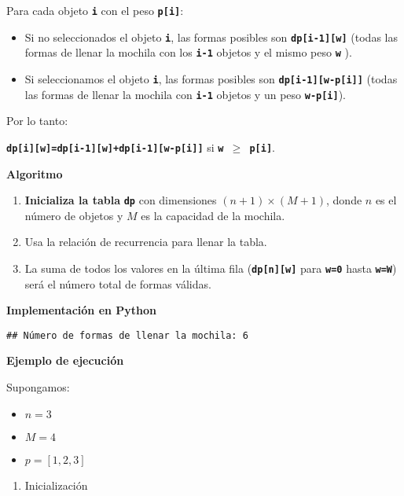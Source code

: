 \begin{enumerate}[label=\color{red}\textbf{\arabic*)}]
  Para cada objeto \textbf{\texttt{i}} con el peso \textbf{\texttt{p[i]}}:
  \begin{itemize}[label=\textbullet]
    \item Si no seleccionados el objeto \textbf{\texttt{i}}, las formas posibles son \textbf{\texttt{dp[i-1][w]}} (todas las formas de llenar la mochila con los \textbf{\texttt{i-1}} objetos y el mismo peso \textbf{\texttt{w}} ).
    \item Si seleccionamos el objeto \textbf{\texttt{i}}, las formas posibles son \textbf{\texttt{dp[i-1][w-p[i]]}} (todas las formas de llenar la mochila con \textbf{\texttt{i-1}} objetos y un peso \textbf{\texttt{w-p[i]}}).
  \end{itemize}
  Por lo tanto:
  \begin{center}
    \textbf{\texttt{dp[i][w]=dp[i-1][w]+dp[i-1][w-p[i]]}} si \textbf{\texttt{w $\ge$ p[i]}}. 
  \end{center}
  \textbf{Algoritmo}
  \begin{enumerate}[label=\arabic*)]
    \item \textbf{Inicializa la tabla} \textbf{\texttt{dp}} con dimensiones $(n+1)\times (M+1)$, donde $n$ es el número de objetos y $M$ es la capacidad de la mochila.
    \item Usa la relación de recurrencia para llenar la tabla.
    \item La suma de todos los valores en la última fila (\textbf{\texttt{dp[n][w]}} para \textbf{\texttt{w=0}} hasta \textbf{\texttt{w=W}}) será el número total de formas válidas.
  \end{enumerate}
  \textbf{Implementación en Python}

  
  \begin{verbatim}
## Número de formas de llenar la mochila: 6
  \end{verbatim}
  \textbf{Ejemplo de ejecución}
  
  Supongamos:
  \begin{itemize}[label=\textbullet]
    \item $n=3$
    \item  $M=4$
    \item  $p = [1,2,3]$
  \end{itemize}
  \begin{enumerate}[label=Paso \arabic*:]
    \item Inicialización


\end{enumerate}
\end{enumerate}
